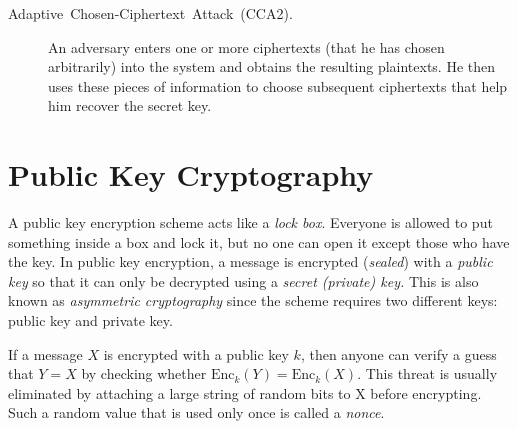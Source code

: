 \documentclass[11pt]{article}
\theoremstyle{plain}
\begin{document}
\begin{description}
	\item [{Adaptive~Chosen-Ciphertext~Attack~(CCA2).}] An adversary enters
	one or more ciphertexts (that he has chosen arbitrarily) into the
	system and obtains the resulting plaintexts. He then uses these pieces
	of information to choose subsequent ciphertexts that help him recover
	the secret key.
\end{description}

\section{Public Key Cryptography \label{sec:Public-Key-Cryptography}}

A public key encryption scheme acts like a \emph{lock box}. Everyone
is allowed to put something inside a box and lock it, but no one can
open it except those who have the key. In public key encryption, a
message is encrypted (\emph{sealed}) with a \emph{public key} so that
it can only be decrypted using a \emph{secret (private) key.} This
is also known as \emph{asymmetric cryptography} since the scheme requires
two different keys: public key and private key.

If a message $X$ is encrypted with a public key $k$, then anyone
can verify a guess that $Y=X$ by checking whether $\text{Enc}_{k}(Y)=\text{Enc}_{k}(X)$.
This threat is usually eliminated by attaching a large string of random
bits to X before encrypting. Such a random value that is used only
once is called a \emph{nonce}.
\end{document}
